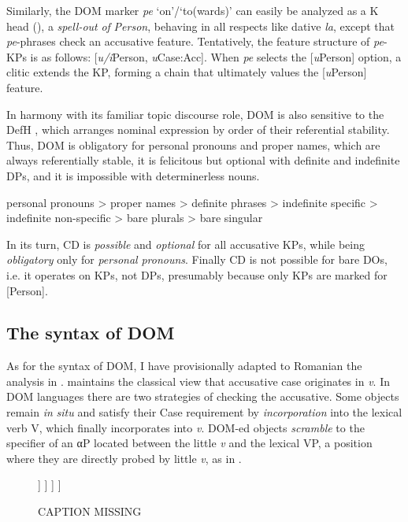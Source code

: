 \documentclass[output=paper,colorlinks,citecolor=brown,nonflat]{./langscibook}
\begin{document}
Similarly, the DOM marker \textit{pe} ‘on’/‘to(wards)’ can easily be analyzed as a K head (\citealt{López2012, HillMardale2017}), a \textit{spell-out} \textit{of} \textit{Person}, behaving in all respects like dative \textit{la}, except that \textit{pe}{}-phrases check an accusative feature. Tentatively, the feature structure of \textit{pe}-KPs is as follows: [\textit{u/i}Person, \textit{u}Case:Acc]. When \textit{pe} selects the [\textit{u}Person] option, a clitic extends the KP, forming a chain that ultimately values the [\textit{u}Person] feature. 

In harmony with its familiar topic discourse role, DOM is also sensitive to the DefH , which arranges nominal expression by order of their referential stability. Thus, DOM is obligatory for personal pronouns and proper names, which are always referentially stable, it is felicitous but optional with definite and indefinite DPs, and it is impossible with determinerless nouns.

\ea%
      \label{ex:cornilescu:21}
       personal pronouns > proper names > definite phrases > indefinite specific > indefinite non-specific  > bare plurals > bare singular
      \z

In its turn, CD is \textit{possible} and \textit{optional} for all accusative KPs, while being \textit{obligatory} only for \textit{personal} \textit{pronouns}. Finally CD is not possible for bare DOs, i.e. it operates on KPs, not DPs, presumably because only KPs are marked for [Person].

\subsection{{The} {syntax} {of} {DOM}}

As for the syntax of DOM, I have provisionally adapted to Romanian the analysis in \citet{López2012}. \citeauthor{López2012} maintains the classical view that accusative case originates in \textit{v}. In DOM languages there are two strategies of checking the accusative. Some objects remain \textit{in} \textit{situ} and satisfy their Case requirement by \textit{incorporation} into the lexical verb V, which finally incorporates into \textit{v}. DOM-ed objects \textit{scramble} to the specifier of an αP located between the little \textit{v} and the lexical VP, a position where they are directly probed by little \textit{v}, as in .

                  
\begin{figure}%
	\begin{forest}
		[\textit{v}P
			[Subject
			]
			[\textit{v}'
				[\textit{v}]
				[αP
					[α]
					[VP
						[V]
						[DO]
					]
				]
			]
		]
	\end{forest}
	\caption{\label{fig:cornilescu:4} CAPTION  MISSING}
\end{figure}
\end{document}
